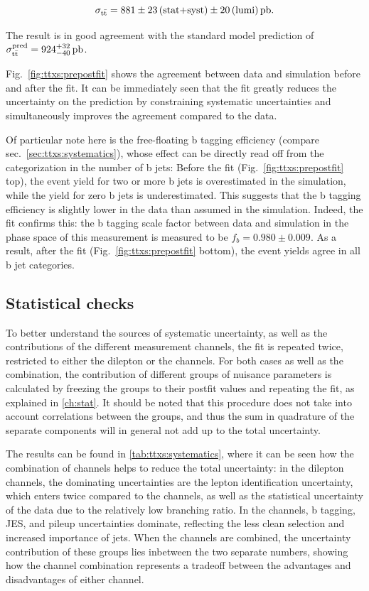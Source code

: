 \[
    \sigma_{\mathrm{t \bar{t}}} = 881 \pm 23 \, \text{(stat+syst)} \pm 20 \, \text{(lumi)} \, \text{pb}.
\]

The result is in good agreement with the standard model prediction of $\sigma_{\mathrm{t \bar{t}}}^{\text{pred}} = 924^{+32}_{-40} \, \text{pb}$.

Fig.~\ref{fig:ttxs:prepostfit} shows the agreement between data and simulation before and after the fit. It can be immediately seen that the fit greatly reduces the uncertainty on the prediction by constraining systematic uncertainties and simultaneously improves the agreement compared to the data. 

Of particular note here is the free-floating b tagging efficiency (compare sec.~\ref{sec:ttxs:systematics}), whose effect can be directly read off from the categorization in the number of b jets: Before the fit (Fig.~\ref{fig:ttxs:prepostfit} top), the event yield for two or more b jets is overestimated in the simulation, while the yield for zero b jets is underestimated. This suggests that the b tagging efficiency is slightly lower in the data than assumed in the simulation. Indeed, the fit confirms this: the b tagging scale factor between data and simulation in the phase space of this measurement is measured to be $f_b  = 0.980 \pm 0.009$. As a result, after the fit (Fig.~\ref{fig:ttxs:prepostfit} bottom), the event yields agree in all b jet categories.

\subsection{Statistical checks}

To better understand the sources of systematic uncertainty, as well as the contributions of the different measurement channels, the fit is repeated twice, restricted to either the dilepton or the \ljets channels. For both cases as well as the combination, the contribution of different groups of nuisance parameters is calculated by freezing the groups to their postfit values and repeating the fit, as explained in \cref{ch:stat}. It should be noted that this procedure does not take into account correlations between the groups, and thus the sum in quadrature of the separate components will in general not add up to the total uncertainty.

The results can be found in \cref{tab:ttxs:systematics}, where it can be seen how the combination of channels helps to reduce the total uncertainty: in the dilepton channels, the dominating uncertainties are the lepton identification uncertainty, which enters twice compared to the \ljets channels, as well as the statistical uncertainty of the data due to the relatively low branching ratio. In the \ljets channels, b tagging, JES, and pileup uncertainties dominate, reflecting the less clean selection and increased importance of jets. When the channels are combined, the uncertainty contribution of these groups lies inbetween the two separate numbers, showing how the channel combination represents a tradeoff between the advantages and disadvantages of either channel.

